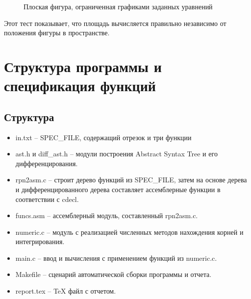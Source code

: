 \documentclass[a4paper,12pt,titlepage,finall]{article}
\begin{document}
\begin{figure}[h]
\caption{Плоская фигура, ограниченная графиками заданных уравнений}
\label{plot2}
\end{figure}

Этот тест показывает, что площадь вычисляется правильно независимо от положения фигуры в пространстве. 


\newpage

\section{Структура программы и спецификация функций}

\subsection{Структура}

\begin{itemize}
    \item in.txt -- SPEC\_FILE, содержащий отрезок и три функции
    \item ast.h и diff\_ast.h -- модули построения Abstract Syntax Tree и его дифференцирования.
    \item rpn2asm.c -- строит дерево функций из SPEC\_FILE, затем на основе дерева и дифференцированного дерева составляет ассемблерные функции в соответствии с cdecl.
    \item funcs.asm -- ассемблерный модуль, составленный rpn2asm.c.
    \item numeric.c -- модуль с реализацией численных методов нахождения корней и интегрирования.
    \item main.c -- ввод и вычисления с применением функций из numeric.c.
    \item Makefile -- сценарий автоматической сборки программы и отчета.
    \item report.tex -- TeX файл с отчетом.
\end{itemize}
\end{document}
